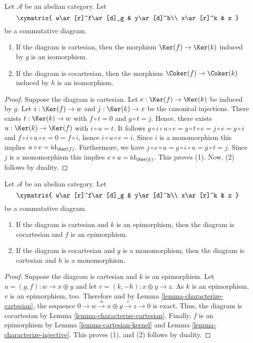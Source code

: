 \begin{lemma}
\label{lemma-cartesian-kernel}
Let $\mathcal{A}$ be an abelian category. Let
$$
\xymatrix{
w\ar[r]^f\ar[d]_g
& y\ar[d]^h\\
x\ar[r]^k
& z
}
$$
be a commutative diagram.
\begin{enumerate}
\item If the diagram is cartesian, then the morphism 
$\Ker(f)\to\Ker(k)$ induced by $g$ is an isomorphism.
\item If the diagram is cocartesian, then the morphism 
$\Coker(f)\to\Coker(k)$ induced by $h$ is an isomorphism.
\end{enumerate}
\end{lemma}

\begin{proof}
Suppose the diagram is cartesian. Let 
$e:\Ker(f)\to\Ker(k)$ be induced by $g$. Let 
$i:\Ker(f)\to w$ and $j:\Ker(k)\to x$ be the canonical 
injections. There exists $t:\Ker(k)\to w$ with $f\circ t=0$ 
and $g\circ t=j$. Hence, there exists $u:\Ker(k)\to\Ker(f)$ 
with $i\circ u=t$. It follows 
$g\circ i\circ u\circ e=g\circ t\circ e=j\circ e=g\circ i$ and 
$f\circ i\circ u\circ e=0=f\circ i$, hence $i\circ u\circ e=i$. Since 
$i$ is a monomorphism this implies $u\circ e=\text{id}_{\Ker(f)}$.
Furthermore, we have $j\circ e\circ u=g\circ i\circ u=g\circ t=j$. 
Since $j$ is a monomorphism this implies $e\circ u=\text{id}_{\Ker(k)}$.
This proves (1). Now, (2) follows by duality.
\end{proof}

\begin{lemma}
\label{lemma-cartesian-cocartesian}
Let $\mathcal{A}$ be an abelian category. Let
$$
\xymatrix{
w\ar[r]^f\ar[d]_g
& y\ar[d]^h\\
x\ar[r]^k
& z
}
$$
be a commutative diagram.
\begin{enumerate}
\item If the diagram is cartesian and $k$ is an epimorphism, 
then the diagram is cocartesian and $f$ is an epimorphism.
\item If the diagram is cocartesian and $g$ is a monomorphism, 
then the diagram is cartesian and $h$ is a monomorphism.
\end{enumerate}
\end{lemma}

\begin{proof}
Suppose the diagram is cartesian and $k$ is an epimorphism. 
Let $u = (g, f) : w \to x \oplus y$ and let $v = (k, -h) : x \oplus y \to z$. 
As $k$ is an epimorphism, $v$ is an epimorphism, too. Therefore 
and by Lemma \ref{lemma-characterize-cartesian}, the sequence 
$0\to w\overset{u}\to x\oplus y\overset{v}\to z\to 0$ is exact. Thus, the 
diagram is cocartesian by Lemma \ref{lemma-characterize-cartesian}. Finally, 
$f$ is an epimorphism by Lemma \ref{lemma-cartesian-kernel} and 
Lemma \ref{lemma-characterize-injective}. This proves (1), and (2) 
follows by duality.
\end{proof}

